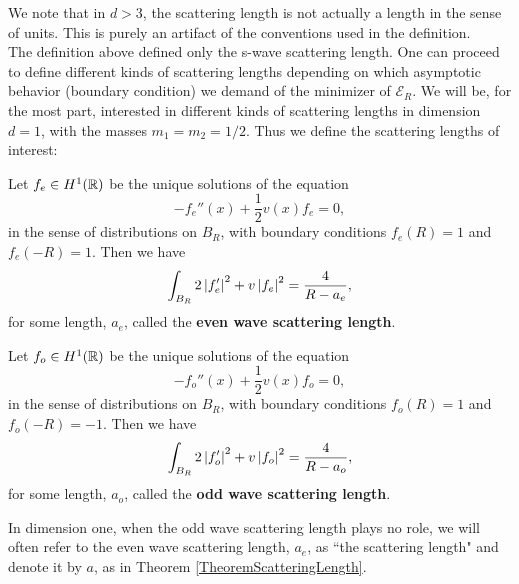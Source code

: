 We note that in $ d>3 $, the scattering length is not actually a length in the sense of units. This is purely an artifact of the conventions used in the definition.\\
The definition above defined only the s-wave scattering length. One can proceed to define different kinds of scattering lengths depending on which asymptotic behavior (boundary condition) we demand of the minimizer of $ \mathcal{E}_R $. We will be, for the most part, interested in different kinds of scattering lengths in dimension $ d=1 $, with the masses $ m_1=m_2=1/2 $. Thus we define the scattering lengths of interest:
\begin{definition}\label{DefinitionEvenScatteringLength}
	Let $ f_e\in H^1(\mathbb{R}) $ be the unique solutions of the equation\begin{equation}\label{EqEvenScatteringEquation}
	-f_e''(x)+\frac{1}{2}v(x)f_e=0,
	\end{equation}
	in the sense of distributions on $ B_R $, with boundary conditions $ f_e(R)=1 $ and $ f_e(-R)=1 $. Then we have \begin{equation}
	\int_{B_R} 2\left\lvert f_e' \right\rvert^2+v \left\lvert f_e \right\rvert^2=\frac{4}{R-a_e},
	\end{equation} 
	for some length, $ a_e $, called the \textbf{even wave scattering length}.
\end{definition}
\begin{definition}\label{DefinitionOddScatteringLenght}
	Let $ f_o\in H^1(\mathbb{R}) $ be the unique solutions of the equation\begin{equation}\label{EqOddScatteringEquation}
	-f_o''(x)+\frac{1}{2}v(x)f_o=0,
	\end{equation}
	in the sense of distributions on $ B_R $, with boundary conditions $ f_o(R)=1 $ and $ f_o(-R)=-1 $. Then we have \begin{equation}
	\int_{B_R} 2\left\lvert f_o' \right\rvert^2+v \left\lvert f_o \right\rvert^2=\frac{4}{R-a_o},
	\end{equation} 
	for some length, $ a_o $, called the \textbf{odd wave scattering length}.
\end{definition}
\begin{remark}
	In dimension one, when the odd wave scattering length plays no role, we will often refer to the even wave scattering length, $a_e$, as ``the scattering length" and denote it by $a$, as in Theorem \ref{TheoremScatteringLength}.
\end{remark}
